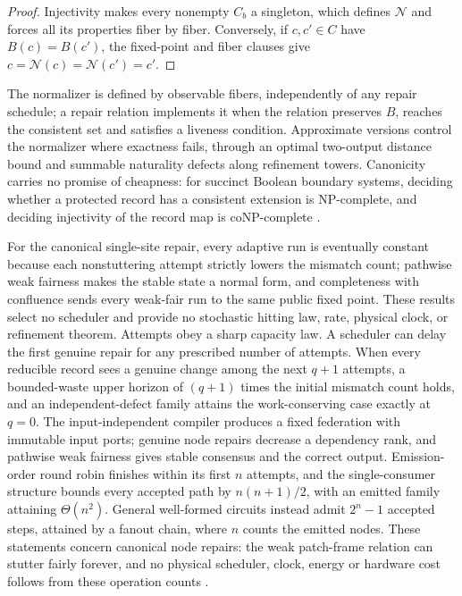 \documentclass[11pt]{article}
\theoremstyle{definition}
\theoremstyle{remark}
\begin{document}
\begin{proof}
Injectivity makes every nonempty $C_b$ a singleton, which defines $\mathcal N$ and forces all its properties fiber by fiber. Conversely, if $c,c'\in C$ have $B(c)=B(c')$, the fixed-point and fiber clauses give $c=\mathcal N(c)=\mathcal N(c')=c'$.
\end{proof}

The normalizer is defined by observable fibers, independently of any repair
schedule; a repair relation implements it when the relation preserves $B$,
reaches the consistent set and satisfies a liveness condition. Approximate
versions control the normalizer where exactness fails, through an optimal
two-output distance bound and summable naturality defects along refinement
towers. Canonicity carries no promise of cheapness: for succinct Boolean
boundary systems, deciding whether a protected record has a consistent
extension is NP-complete, and deciding injectivity of the record map is
coNP-complete \cite{ophnormalforms}.

For the canonical single-site repair, every adaptive run is eventually
constant because each nonstuttering attempt strictly lowers the mismatch
count; pathwise weak fairness makes the stable state a normal form, and
completeness with confluence sends every weak-fair run to the same public
fixed point. These results select no scheduler and provide no stochastic hitting law, rate, physical clock, or refinement theorem.
Attempts obey a sharp capacity law. A scheduler can delay the first genuine repair for any prescribed number of attempts. When every reducible record sees a genuine change among the next $q+1$ attempts, a bounded-waste upper horizon of $(q+1)$ times the initial mismatch count holds, and an independent-defect family attains the work-conserving case exactly at $q=0$.
The input-independent compiler produces a fixed federation with immutable input ports;
genuine node repairs decrease a dependency rank, and pathwise weak fairness
gives stable consensus and the correct output.
Emission-order round robin finishes within its first $n$ attempts, and the single-consumer structure bounds every accepted path by $n(n+1)/2$, with an emitted family attaining $\Theta(n^2)$.
General well-formed circuits instead admit $2^n-1$ accepted steps, attained by a fanout chain, where $n$ counts the emitted nodes.
These statements concern canonical node repairs: the weak patch-frame relation can stutter fairly forever, and no physical scheduler, clock, energy or hardware cost follows from these operation counts \cite{ophnormalforms,ophconsensus}.
\end{document}
